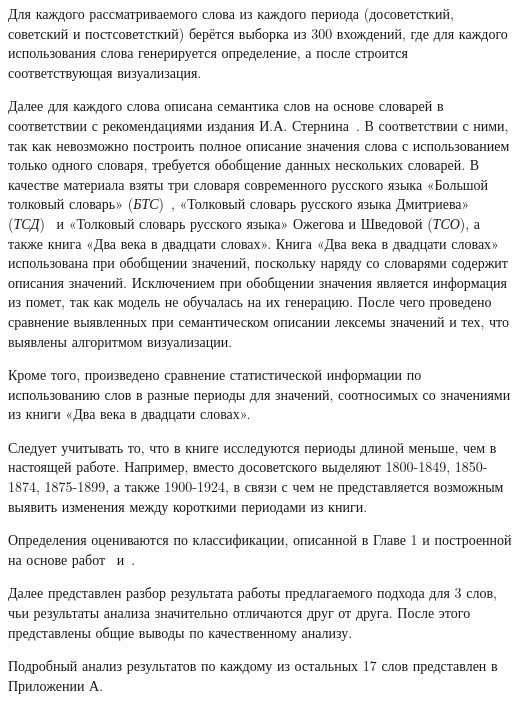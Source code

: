 \documentclass[LI,VKR]{HSEUniversity}
\begin{document}
Для каждого рассматриваемого слова из каждого периода (досоветсткий, советский и постсоветсткий)
берётся выборка из 300 вхождений,
где для каждого использования слова генерируется определение, а после строится соответствующая визуализация.

Далее для каждого слова описана семантика слов на основе словарей в соответствии
с рекомендациями издания И.А. Стернина~\cite{SemanticDefinitionsAndAnalysis}.
В соответствии с ними, так как невозможно построить полное описание значения слова
с использованием только одного словаря, требуется обобщение данных нескольких словарей.
В качестве материала взяты три словаря современного русского языка
«Большой толковый словарь» (\textit{БТС})~\cite{TolkovyKuznetsov},
«Толковый словарь русского языка Дмитриева» (\textit{ТСД})~\cite{TolkovyDmitriev} и
«Толковый словарь русского языка» Ожегова и Шведовой (\textit{ТСО}),
а также книга «Два века в двадцати словах».
Книга «Два века в двадцати словах» использована при обобщении значений,
поскольку наряду со словарями содержит описания значений.
Исключением при обобщении значения является информация из помет,
так как модель не обучалась на их генерацию.
После чего проведено сравнение выявленных при семантическом описании лексемы
значений и тех, что выявлены алгоритмом визуализации.

Кроме того, произведено сравнение статистической информации по использованию слов
в разные периоды для значений, соотносимых со значениями из книги
«Два века в двадцати словах».

Следует учитывать то, что в книге исследуются периоды длиной меньше, чем в настоящей работе.
Например, вместо досоветского выделяют 1800-1849, 1850-1874, 1875-1899, а также 1900-1924,
в связи с чем не представляется возможным выявить изменения между короткими периодами из книги.

Определения оцениваются по классификации, описанной в Главе 1 и построенной на основе работ~\cite{huang-etal-2021-definition} и~\cite{noraset2016definition}.

Далее представлен разбор результата работы предлагаемого подхода для 3 слов, чьи результаты анализа
значительно отличаются друг от друга.
После этого представлены общие выводы по качественному анализу.

Подробный анализ результатов по каждому из остальных 17 слов представлен в Приложении А.
\end{document}

